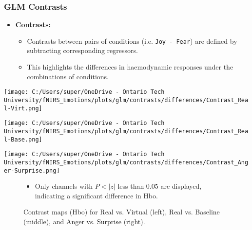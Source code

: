 \documentclass{beamer}
\begin{document}
\begin{frame}
    \frametitle{GLM Contrasts}
    \begin{itemize}
        \item \textbf{Contrasts:}
        \begin{itemize}
            \item Contrasts between pairs of conditions (i.e. \texttt{Joy - Fear}) are defined by subtracting corresponding regressors. 
            \item This highlights the differences in haemodynamic responses under the combinations of conditions.
        \end{itemize}
    \end{itemize}
    \begin{minipage}[t]{0.3\textwidth}
        \vspace{-\baselineskip}
        \texttt{[image: C:/Users/super/OneDrive - Ontario Tech University/fNIRS\_Emotions/plots/glm/contrasts/differences/Contrast\_Real-Virt.png]}
    \end{minipage}
    \begin{minipage}[t]{0.3\textwidth}
        \vspace{-\baselineskip}
        \texttt{[image: C:/Users/super/OneDrive - Ontario Tech University/fNIRS\_Emotions/plots/glm/contrasts/differences/Contrast\_Real-Base.png]}
    \end{minipage}
    \begin{minipage}[t]{0.3\textwidth}
        \vspace{-\baselineskip}
        \texttt{[image: C:/Users/super/OneDrive - Ontario Tech University/fNIRS\_Emotions/plots/glm/contrasts/differences/Contrast\_Anger-Surprise.png]}
    \end{minipage}
    \begin{figure}
        \caption{Contrast maps (Hbo) for Real vs. Virtual (left), Real vs. Baseline (middle), and Anger vs. Surprise (right).}
        \begin{itemize}
            \item Only channels with \(P < |z|\) less than 0.05 are displayed, indicating a significant difference in Hbo.
        \end{itemize}
    \end{figure}
\end{frame}
\end{document}
